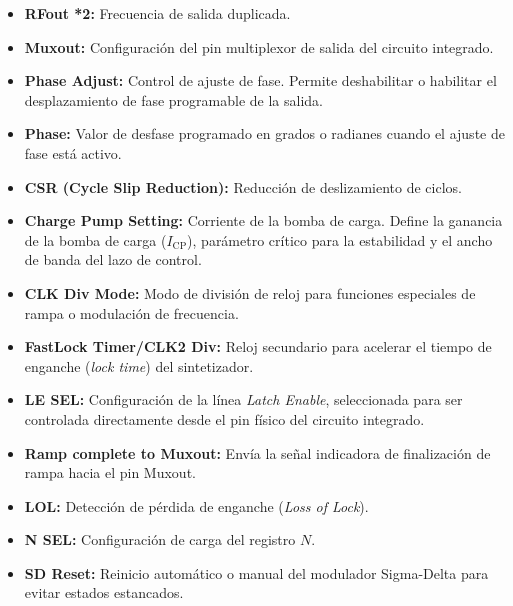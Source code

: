 \begin{itemize}
    \item \textbf{RFout *2:} Frecuencia de salida duplicada.
    
    \item \textbf{Muxout:} Configuración del pin multiplexor de salida del circuito integrado.
    
    \item \textbf{Phase Adjust:} Control de ajuste de fase. Permite deshabilitar o habilitar el desplazamiento de fase programable de la salida.
    
    \item \textbf{Phase:} Valor de desfase programado en grados o radianes cuando el ajuste de fase está activo.
    
    \item \textbf{CSR (Cycle Slip Reduction):} Reducción de deslizamiento de ciclos.
    
    \item \textbf{Charge Pump Setting:} Corriente de la bomba de carga. Define la ganancia de la bomba de carga ($I_{\mathrm{CP}}$), parámetro crítico para la estabilidad y el ancho de banda del lazo de control.
    
    \item \textbf{CLK Div Mode:} Modo de división de reloj para funciones especiales de rampa o modulación de frecuencia.
    
    \item \textbf{FastLock Timer/CLK2 Div:} Reloj secundario para acelerar el tiempo de enganche (\textit{lock time}) del sintetizador.
    
    \item \textbf{LE SEL:} Configuración de la línea \textit{Latch Enable}, seleccionada para ser controlada directamente desde el pin físico del circuito integrado.
    
    \item \textbf{Ramp complete to Muxout:} Envía la señal indicadora de finalización de rampa hacia el pin Muxout.
    
    \item \textbf{LOL:} Detección de pérdida de enganche (\textit{Loss of Lock}).
    
    \item \textbf{N SEL:} Configuración de carga del registro $N$.
    
    \item \textbf{SD Reset:} Reinicio automático o manual del modulador Sigma-Delta para evitar estados estancados.
    

\end{itemize}
